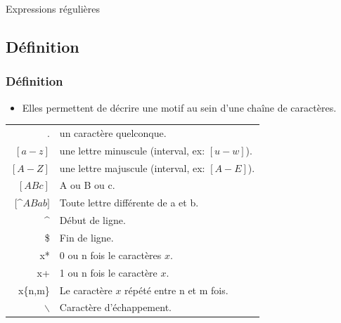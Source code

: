 \documentclass[10pt, xcolor=dvipsnames]{beamer}
\begin{document}
\frame
{
\begin{block}{}
\begin{center}
\begin{huge}
Expressions régulières
 \end{huge}
\end{center}
\end{block}

}


\subsection{Définition}


\begin{frame}[fragile]
\frametitle{Définition}

    \begin{itemize}
        \item Elles permettent de décrire une motif au sein d'une chaîne de caractères. \\
    \end{itemize}
\begin{small}
\begin{tabular}{|r|l|}
\hline
         . & un caractère quelconque.\\
         $[a-z]$ & une lettre minuscule (interval, ex: $[u-w]$). \\
         $[A-Z]$ & une lettre majuscule (interval, ex: $[A-E]$). \\
         $[ABc]$  & A ou B ou c.\\
         $[$\^{}$ABab]$ & Toute lettre différente de a et b.\\
         \^{} & Début de ligne.\\
         \$ & Fin de ligne.\\
         x* & 0 ou n fois le caractères $x$.\\
         x+ & 1 ou n fois le caractère $x$.\\
         x\{n,m\} & Le caractère $x$ répété entre n et m fois.\\
         $\backslash$ & Caractère d'échappement.\\
\hline
\end{tabular}
\end{small}
\end{frame}
\end{document}
